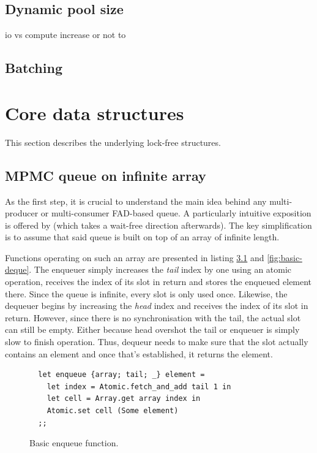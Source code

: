 \documentclass[12pt,a4paper,twoside]{report}
\begin{document}
\section{Dynamic pool size}

io vs compute increase or not to
\section{Batching}




\chapter{Core data structures}
\label{section:underlying_data_structures}

This section describes the underlying lock-free structures. 

\section{MPMC queue on infinite array}
\label{section:mpmc_queue_on_inf}
As the first step, it is crucial to understand the main idea behind any multi-producer or multi-consumer FAD-based queue. A particularly intuitive exposition is offered by \cite{Yang2016} (which takes a wait-free direction afterwards). The key simplification is to assume that said queue is built on top of an array of infinite length. 

Functions operating on such an array are presented in listing \ref{fig:basic-enqueue} and \ref{fig:basic-deque}. The enqueuer simply increases the \textit{tail} index by one using an atomic operation, receives the index of its slot in return and stores the enqueued element there. Since the queue is infinite, every slot is only used once. Likewise, the dequeuer begins by increasing the \textit{head} index and receives the index of its slot in return. However, since there is no synchronisation with the tail, the actual slot can still be empty. Either because head overshot the tail or enqueuer is simply slow to finish operation. Thus, dequeur needs to make sure that the slot actually contains an element and once that's established, it returns the element. 

\begin{figure}
    \centering
    \begin{verbatim}
  let enqueue {array; tail; _} element = 
    let index = Atomic.fetch_and_add tail 1 in
    let cell = Array.get array index in 
    Atomic.set cell (Some element)
  ;;
    \end{verbatim}
    \caption{Basic enqueue function.}
    \label{fig:basic-enqueue}
\end{figure}
\end{document}
